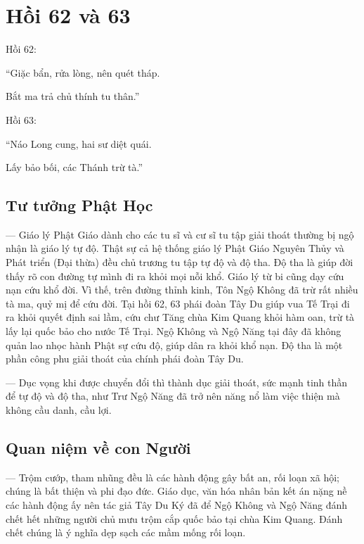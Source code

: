 \chapter{Hồi 62 và 63} %
\label{cha:hoi_62_63}

Hồi 62:

\begin{itshape}
``Giặc bẩn, rửa lòng, nên quét tháp.

Bắt ma trả chủ thính tu thân.''
\end{itshape}

Hồi 63:

\begin{itshape}
``Náo Long cung, hai sư diệt quái.

Lấy bảo bối, các Thánh trừ tà.''
\end{itshape}

\section{Tư tưởng Phật Học} %
\label{sec:62_63_phat_hoc}

--- Giáo lý Phật Giáo dành cho các tu sĩ và cư sĩ tu tập giải thoát thường bị ngộ nhận là giáo lý tự độ. Thật sự cả hệ thống giáo lý Phật Giáo Nguyên Thủy và Phát triển (Đại thừa) đều chủ trương tu tập tự độ và độ tha. Độ tha là giúp đời thấy rõ con đường tự mình đi ra khỏi mọi nỗi khổ. Giáo lý từ bi cũng dạy cứu nạn cứu khổ đời. Vì thế, trên đường thỉnh kinh, Tôn Ngộ Không đã trừ rất nhiều tà ma, quỷ mị để cứu đời. Tại hồi 62, 63 phái đoàn Tây Du giúp vua Tế Trại đi ra khỏi quyết định sai lầm, cứu chư Tăng chùa Kim Quang khỏi hàm oan, trừ tà lấy lại quốc bảo cho nước Tế Trại. Ngộ Không và Ngộ Năng tại đây đã không quản lao nhọc hành Phật sự cứu độ, giúp dân ra khỏi khổ nạn. Độ tha là một phần công phu giải thoát của chính phái đoàn Tây Du.

--- Dục vọng khi được chuyển đổi thì thành dục giải thoát, sức mạnh tinh thần để tự độ và độ tha, như Trư Ngộ Năng đã trở nên năng nổ làm việc thiện mà không cầu danh, cầu lợi.

\section{Quan niệm về con Người} %
\label{sec:62_63_con_nguoi}

--- Trộm cướp, tham nhũng đều là các hành động gây bất an, rối loạn xã hội; chúng là bất thiện và phi đạo đức. Giáo dục, văn hóa nhân bản kết án nặng nề các hành động ấy nên tác giả Tây Du Ký đã để Ngộ Không và Ngộ Năng đánh chết hết những người chủ mưu trộm cắp quốc bảo tại chùa Kim Quang. Đánh chết chúng là ý nghĩa dẹp sạch các mầm mống rối loạn.


